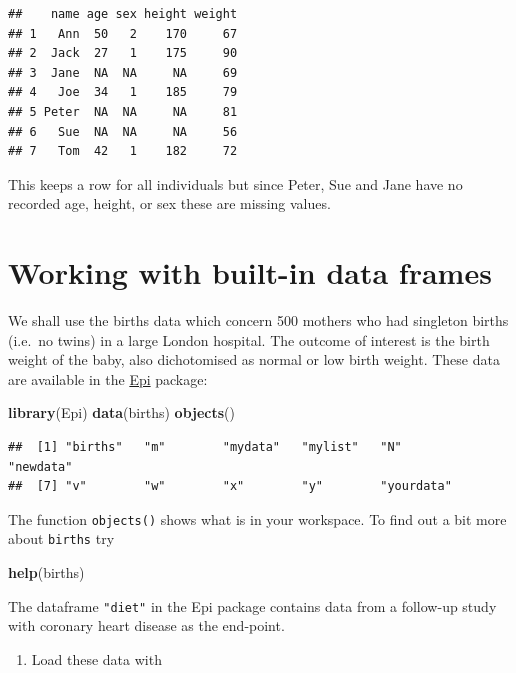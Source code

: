 \documentclass[
]{book}
\newenvironment{Shaded}{\begin{snugshade}}{\end{snugshade}}
\newcommand{\FunctionTok}[1]{\textcolor[rgb]{0.13,0.29,0.53}{\textbf{#1}}}
\newcommand{\NormalTok}[1]{#1}
\providecommand{\tightlist}{%
  \setlength{\itemsep}{0pt}\setlength{\parskip}{0pt}}
\begin{document}
\begin{verbatim}
##    name age sex height weight
## 1   Ann  50   2    170     67
## 2  Jack  27   1    175     90
## 3  Jane  NA  NA     NA     69
## 4   Joe  34   1    185     79
## 5 Peter  NA  NA     NA     81
## 6   Sue  NA  NA     NA     56
## 7   Tom  42   1    182     72
\end{verbatim}

This keeps a row for all individuals but since Peter, Sue and Jane
have no recorded age, height, or sex these are missing values.

\section{Working with built-in data frames}\label{working-with-built-in-data-frames}

We shall use the births data which concern 500 mothers who had
singleton births (i.e.~no twins) in a large London hospital. The
outcome of interest is the birth weight of the baby, also dichotomised
as normal or low birth weight. These data are available in the \href{https://cran.r-project.org/web/packages/Epi/index.html}{Epi}
package:

\begin{Shaded}
\begin{Highlighting}[]
\FunctionTok{library}\NormalTok{(Epi)}
\FunctionTok{data}\NormalTok{(births)}
\FunctionTok{objects}\NormalTok{()}
\end{Highlighting}
\end{Shaded}

\begin{verbatim}
##  [1] "births"   "m"        "mydata"   "mylist"   "N"        "newdata" 
##  [7] "v"        "w"        "x"        "y"        "yourdata"
\end{verbatim}

The function \texttt{objects()} shows what is in your workspace. To
find out a bit more about \texttt{births} try

\begin{Shaded}
\begin{Highlighting}[]
\FunctionTok{help}\NormalTok{(births)}
\end{Highlighting}
\end{Shaded}

The dataframe \texttt{"diet"} in the Epi package contains data from a follow-up study with
coronary heart disease as the end-point.

\begin{enumerate}
\def\labelenumi{\arabic{enumi}.}
\tightlist
\item
  Load these data with
\end{enumerate}
\end{document}
